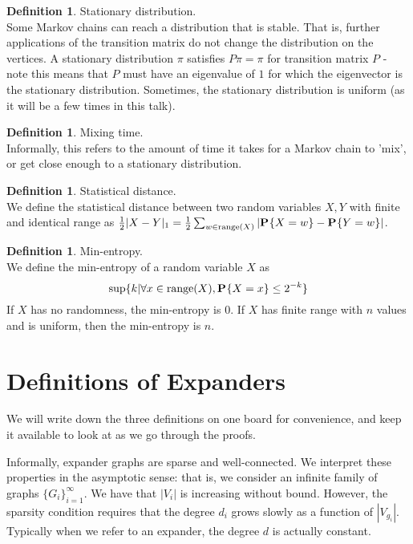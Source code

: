 \documentclass[11pt]{article}
\theoremstyle{definition}
\newtheorem{definition}[theorem]{Definition}
\theoremstyle{definition}
\theoremstyle{definition}
\newcommand{\txt}[1]
{\textnormal{#1}}
\newcommand{\prob}[2]
{\textbf{P}_{#1}\{{#2}\}}
\begin{document}
\begin{definition} Stationary distribution. \\
Some Markov chains can reach a distribution that is stable. 
That is, further applications of the transition matrix do not
change the distribution on the vertices. A stationary distribution $\pi$
satisfies $P\pi = \pi$ for transition matrix $P$ - note this means that $P$
must have an eigenvalue of $1$ for which the eigenvector is the stationary distribution. Sometimes, the stationary distribution is uniform (as it will be a few times in this talk). 
\end{definition}

\begin{definition} Mixing time. \\
Informally, this refers to the amount of time it takes
for a Markov chain to 'mix', or get close enough to a stationary distribution.
\end{definition}

\begin{definition} Statistical distance. \\
We define the statistical distance between two
random variables $X, Y$ with finite and identical range
as $\frac{1}{2} |X - Y|_1 = \frac{1}{2} \sum_{w \in \txt{range}(X)} |\prob{}{X = w} - \prob{}{Y = w}|$. 
\end{definition}

\begin{definition} Min-entropy. \\
We define the min-entropy of a random variable $X$ as
\[
\txt{sup} \{k | \forall x \in \txt{range}(X), \prob{}{X = x} \leq 2^{-k}\}
\]
If $X$ has no randomness, the min-entropy is $0$. If $X$ has finite range
with $n$ values and is uniform, then the min-entropy is $n$. 
\end{definition}

\section{Definitions of Expanders}

We will write down the three definitions on one board for convenience, and keep it available to look at as we go through the proofs. 

Informally, expander graphs are sparse and well-connected. We interpret these properties in the asymptotic sense: that is, we consider an infinite family of graphs $\{G_i\}_{i = 1}^{\infty}$. We have that $|V_i|$ is increasing without bound. However, the sparsity condition requires that the degree $d_i$ grows slowly as a function of $|V_{g_i}|$. Typically when we refer to an expander, the degree $d$ is actually constant.
\end{document}
